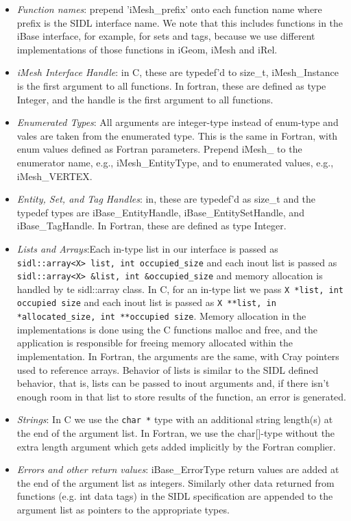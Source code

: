 \documentclass{article}
\begin{document}
\begin{itemize}

\item {\it Function names}: prepend 'iMesh\_prefix' onto each function
name where prefix is the SIDL interface name.  We note that this
includes functions in the iBase interface, for example, for sets and
tags, because we use different implementations of those functions in
iGeom, iMesh and iRel.

\item {\it iMesh Interface Handle}: in C, these are typedef'd to
size\_t, iMesh\_Instance is the first argument to all functions.  In
fortran, these are defined as type Integer, and the handle is the
first argument to all functions.

\item {\it Enumerated Types}: All arguments are integer-type instead
of enum-type and vales are taken from the enumerated type.  This is
the same in Fortran, with enum values defined as Fortran parameters.
Prepend iMesh\_ to the enumerator name, e.g., iMesh\_EntityType, and to
enumerated values, e.g., iMesh\_VERTEX.

\item {\it Entity, Set, and Tag Handles}: in, these are typedef'd as
size\_t and the typedef types are iBase\_EntityHandle,
iBase\_EntitySetHandle, and iBase\_TagHandle. In Fortran, these are
defined as type Integer.

\item {\it Lists and Arrays}:Each in-type list in our interface is
passed as {\tt sidl::array<X> list, int occupied\_size} and each inout
list is passed as {\tt sidl::array<X> \&list, int \&occupied\_size} and
memory allocation is handled by te sidl::array class.  In C, for an
in-type list we pass {\tt X *list, int occupied size} and each inout
list is passed as {\tt X **list, in *allocated\_size, int **occupied
size}. Memory allocation in the implementations is done using the C
functions malloc and free, and the application is responsible for
freeing memory allocated within the implementation.  In Fortran, the
arguments are the same, with Cray pointers used to reference arrays.
Behavior of lists is similar to the SIDL defined behavior, that
is, lists can be passed to inout arguments and, if there isn't enough
room in that list to store results of the function, an error is
generated.

\item {\it Strings}: In C we use the {\tt char *} type with an additional
string length(s) at the end of the argument list.  In Fortran, we use the
char[]-type without the extra length argument which gets added implicitly
by the Fortran complier.

\item {\it Errors and other return values}: iBase\_ErrorType return
values are added at the end of the argument list as integers.
Similarly other data returned from functions (e.g. int data tags) in
the SIDL specification are appended to the argument list as pointers
to the appropriate types.

\end{itemize}
\end{document}
